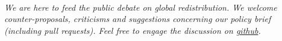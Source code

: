 \documentclass[12pt,english]{article}
\begin{document}
\quad \\ \quad 

\textit{We are here to feed the public debate on global redistribution. We welcome counter-proposals, criticisms and suggestions concerning our policy brief (including pull requests). Feel free to engage the discussion on \href{https://github.com/bixiou/global_tax_attitudes/issues}{github}. }

\clearpage
\renewcommand{\url}[1]{\href{#1}{Link}} %

\end{document}
